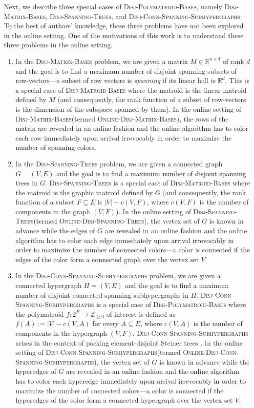 \documentclass[11pt]{article}
\theoremstyle{definition}
\newcommand{\Z}{\mathbb{Z}}
\newcommand{\DPB}{\textsc{Disj-Polymatroid-Bases}\xspace}
\newcommand{\DMB}{\textsc{Disj-Matroid-Bases}\xspace}
\newcommand{\MatrixDB}{\textsc{Disj-Matrix-Bases}\xspace}
\newcommand{\OMatrixDB}{\textsc{Online-Disj-Matrix-Bases}\xspace}
\newcommand{\DST}{\textsc{Disj-Spanning-Trees}\xspace}
\newcommand{\ODST}{\textsc{Online-Disj-Spanning-Trees}\xspace}
\newcommand{\DCSS}{\textsc{Disj-Conn-Spanning-Subhypergraphs}\xspace}
\newcommand{\ODCSS}{\textsc{Online-Disj-Conn-Spanning-Subhypergraphs}\xspace}
\begin{document}
Next, we describe three special cases of \DPB, namely \MatrixDB, \DST, and \DCSS. To the best of authors' knowledge, these three problems have not been explored in the online setting. One of the motivations of this work is to understand these three problems in the online setting. 
\begin{enumerate}
\item In the \MatrixDB problem, we are given a matrix $M\in \mathbb{R}^{n\times d}$ of rank $d$ and the goal is to find a maximum number of disjoint spanning subsets of row-vectors---a subset of row vectors is \emph{spanning} if its linear hull is $\mathbb{R}^d$. This is a special case of \DMB where the matroid is the linear matroid defined by $M$ (and consequently, the rank function of a subset of row-vectors is the dimension of the subspace spanned by them). In the online setting of \MatrixDB (termed \OMatrixDB), the rows of the matrix are revealed in an online fashion and the online algorithm has to color each row immediately upon arrival irrevocably in order to maximize the number of spanning colors. 

\item In the \DST problem, we are given a connected graph $G=(V, E)$
and the goal is to find a maximum number of disjoint spanning trees in $G$. 
\DST is a special case of \DMB where the matroid is the graphic matroid defined by $G$ (and consequently, the rank function of a subset $F\subseteq E$ is $|V|-c(V, F)$, where $c(V, F)$ is the number of components in the graph $(V, F)$). In the online setting of \DST (termed \ODST), the vertex set of $G$ is known in advance while the edges of $G$ are revealed in an online fashion and the online algorithm has to color each edge immediately upon arrival irrevocably in order to maximize the number of connected colors---a color is connected if the edges of the color form a connected graph over the vertex set $V$. 

\item In the \DCSS problem, we are given a connected hypergraph $H=(V, E)$
and the goal is to find a maximum number of disjoint connected spanning subhypergraphs in $H$. 
\DCSS is a special case of \DPB where the polymatroid $f:2^E\rightarrow \Z_{\ge 0}$ of interest is defined as $f(A):=|V|-c(V, A)$ for every $A\subseteq E$, where $c(V, A)$ is the number of components in the hypergraph $(V, F)$. \DCSS arises in the context of packing element-disjoint Steiner trees \cite{CS07}. In the online setting of \DCSS (termed \ODCSS), the vertex set of $G$ is known in advance while the hyperedges of $G$ are revealed in an online fashion and the online algorithm has to color each hyperedge immediately upon arrival irrevocably in order to maximize the number of connected colors---a color is connected if the hyperedges of the color form a connected hypergraph over the vertex set $V$. \end{enumerate}
\end{document}
